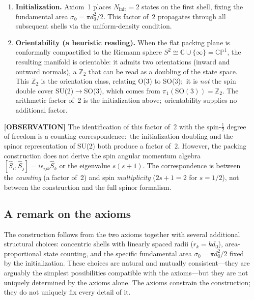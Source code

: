 \documentclass[aps,prl,reprint,amsmath,amssymb]{revtex4-2}
\begin{document}
\begin{enumerate}
\item \textbf{Initialization.}  Axiom~1 places
  $N_{\mathrm{init}} = 2$ states on the first shell, fixing the
  fundamental area $\sigma_0 = \pi d_0^2 / 2$.  This factor of~2
  propagates through all subsequent shells via the uniform-density
  condition.

\item \textbf{Orientability (a heuristic reading).}  When the flat
  packing plane is conformally compactified to the Riemann sphere
  $S^2 \cong \mathbb{C} \cup \{\infty\} = \mathbb{CP}^1$, the resulting
  manifold is orientable: it admits two orientations (inward and
  outward normals), a $\mathbb{Z}_2$ that can be read as a doubling of
  the state space.  This $\mathbb{Z}_2$ is the orientation class,
  relating O(3) to SO(3);\ it is \emph{not} the spin double cover
  SU(2)$\to$SO(3), which comes from $\pi_1(\mathrm{SO}(3)) = \mathbb{Z}_2$.  The arithmetic factor of~2 is the
  initialization above;\ orientability supplies no additional factor.
\end{enumerate}

\textbf{[OBSERVATION]} The identification of this factor of~2 with the
spin-$\tfrac{1}{2}$ degree of freedom is a counting correspondence:\
the initialization doubling and the spinor representation of SU(2)
both produce a factor of~2.  However, the
packing construction does not derive the spin angular momentum algebra
$[\hat{S}_i, \hat{S}_j] = i\epsilon_{ijk}\hat{S}_k$ or the
eigenvalue $s(s+1)$.  The correspondence is between the \emph{counting}
(a factor of~2) and spin \emph{multiplicity} ($2s+1 = 2$ for
$s = 1/2$), not between the construction and the full spinor
formalism.

\subsection{A remark on the axioms}

The construction follows from the two axioms together with several
additional structural choices: concentric shells with linearly spaced
radii ($r_k = k d_0$), area-proportional state counting, and the
specific fundamental area $\sigma_0 = \pi d_0^2 / 2$ fixed by the
initialization.  These choices are natural and mutually
consistent---they are arguably the simplest possibilities compatible
with the axioms---but they are not uniquely determined by the axioms
alone.  The axioms constrain the construction; they do not uniquely
fix every detail of it.
\end{document}
